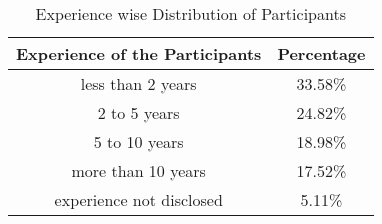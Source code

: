 \begin{table}
\centering
\caption{Experience wise Distribution of Participants}
\begin{tabular}{|c|c|}
\hline
\textbf{Experience of the Participants} & \textbf{Percentage}\\
\hline
less than 2 years & 33.58\%\\ 
2 to 5 years & 24.82\%\\ 
5 to 10 years & 18.98\%\\
more than 10 years & 17.52\%\\
experience not disclosed & 5.11\%\\
\hline
\end{tabular}
\label{tab:experience}
\end{table}